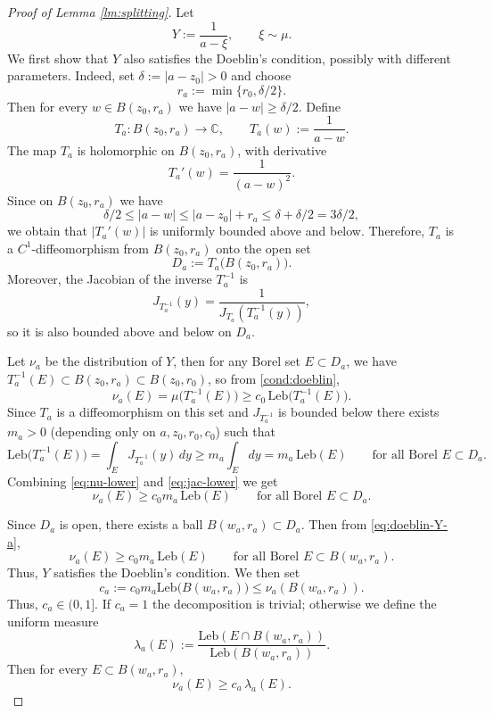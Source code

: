 \documentclass[10pt,a4paper]{amsart}
\newcommand\C{{\mathbb{C}}}
\begin{document}
 \begin{proof} [Proof of Lemma \ref{lm:splitting}]
 	Let
 	\[
 	Y := \frac{1}{a - \xi}, \qquad \xi \sim \mu.
 	\]
 	We first show that $Y$ also satisfies the Doeblin's condition, possibly with different parameters. Indeed, set $\delta := |a - z_0|>0$ and choose
 	\[
 	r_a := \min\{r_0, \delta/2\}.
 	\]
 	Then for every $w \in B(z_0, r_a)$ we have $|a - w|\ge \delta/2.$
 	Define
 	\[
 	T_a : B(z_0, r_a) \to \C, \qquad T_a(w) := \frac{1}{a - w}.
 	\]
 	The map $T_a$ is holomorphic on $B(z_0, r_a)$, with derivative
 	\[
 	T_a'(w) = \frac{1}{(a-w)^2}.
 	\]
 	Since on $B(z_0,r_a)$ we have
 	\[
 	\delta/2 \le |a-w| \le |a - z_0| + r_a \le \delta + \delta/2 = 3\delta/2,
 	\]
 	we obtain that $ |T_a'(w)|$ is uniformly bounded above and below. Therefore, $T_a$ is a $C^1$-diffeomorphism from $B(z_0, r_a)$ onto the open set
 	\[
 	D_a := T_a\big(B(z_0, r_a)\big).
 	\]
 	Moreover, the Jacobian of the inverse $T_a^{-1}$ is
 	\[
 	J_{T_a^{-1}}(y) = \frac{1}{J_{T_a}(T_a^{-1}(y))},
 	\]
 	so it is also bounded above and below on $D_a$.
 	
 	\medskip
 	
 	Let $\nu_a$ be the distribution of $Y$, then for any Borel set $E \subset D_a$, we have $T_a^{-1}(E) \subset B(z_0, r_a) \subset B(z_0, r_0)$, so from \eqref{cond:doeblin},
 	\begin{equation}
 		\nu_a(E) = \mu\big(T_a^{-1}(E)\big) \ge c_0 \, \mathrm{Leb}\big(T_a^{-1}(E)\big).
 		\label{eq:nu-lower}	 		
 	\end{equation}
 	Since $T_a$ is a diffeomorphism on this set and $J_{T_a^{-1}}$ is bounded below there exists $m_a>0$ (depending only on $a, z_0, r_0, c_0$) such that
 	\begin{equation}
 		\mathrm{Leb}\big(T_a^{-1}(E)\big)
 		= \int_{E} J_{T_a^{-1}}(y)\, dy
 		\ge m_a \int_{E} dy
 		= m_a \, \mathrm{Leb}(E)
 		\qquad \text{for all Borel } E \subset D_a.
 		\label{eq:jac-lower}
 	\end{equation}
 	Combining \eqref{eq:nu-lower} and \eqref{eq:jac-lower} we get
 	\begin{equation}
 		\nu_a(E) \ge c_0 m_a \, \mathrm{Leb}(E)
 		\qquad \text{for all Borel } E \subset D_a.
 		\label{eq:doeblin-Y-a}
 	\end{equation}
 	
 	\medskip
 	
 	Since $D_a$ is open, there exists a ball $B(w_a, r_a) \subset D_a$.  
 	Then from \eqref{eq:doeblin-Y-a},
 	\[
 	\nu_a(E) \ge c_0 m_a \, \mathrm{Leb}(E)
 	\qquad \text{for all Borel } E \subset B(w_a, r_a).
 	\]
 	Thus, $Y$ satisfies the Doeblin's condition. We then set
 	\[
 	c_a := c_0 m_a \mathrm{Leb}\big(B(w_a, r_a)\big) \le \nu_a(B(w_a, r_a)).
 	\]
 	Thus, $c_a\in (0, 1]$.
 	If $c_a=1$ the decomposition is trivial; otherwise we define the uniform measure
 	\[
 	\lambda_a(E) := \frac{\mathrm{Leb}(E \cap B(w_a, r_a))}{\mathrm{Leb}(B(w_a, r_a))}.
 	\]
 	Then for every $E \subset B(w_a, r_a)$,
 	\begin{equation}
 		\nu_a(E) \ge c_a \, \lambda_a(E).
 	\end{equation}
 	

\end{proof}
\end{document}
